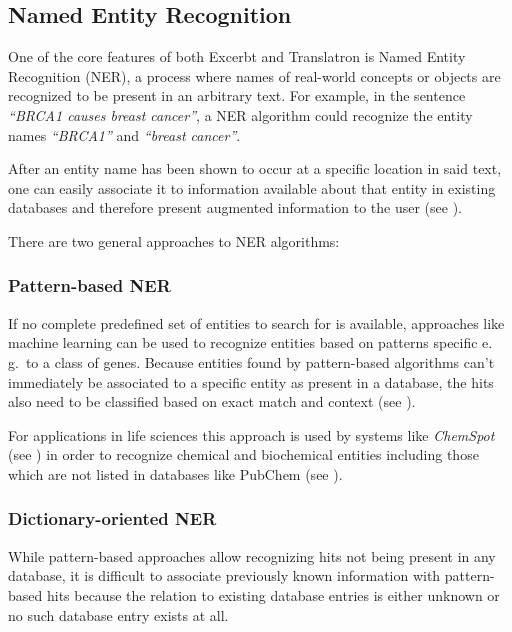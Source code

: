 \documentclass[a4paper, 12pt, twoside, reqn]{report}
\numberwithin{figure}{chapter}
\newtheorem[L]{boxedDefinition}{Definition}
\newtheorem[L]{boxedExample}{Example}
\newcommand{\eg}{e.\,g.\ }
\newcommand{\itquote}[1]{\textit{{``}#1{''}}}
\begin{document}
\subsection{Named Entity Recognition}\label{ssec:ner}

One of the core features of both Excerbt and Translatron is Named Entity Recognition (NER), a process where names of real-world concepts or objects are recognized to be present in an arbitrary text. For example, in the sentence \itquote{BRCA1 causes breast cancer}, a NER algorithm could recognize the entity names \itquote{BRCA1} and \itquote{breast cancer}.

After an entity name has been shown to occur at a specific location in said text, one can easily associate it to information available about that entity in existing databases and therefore present augmented information to the user (see \cite{nadeau2007survey}).

There are two general approaches to NER algorithms:

\subsubsection{Pattern-based NER}

If no complete predefined set of entities to search for is available, approaches like machine learning can be used to recognize entities based on patterns specific \eg to a class of genes. Because entities found by pattern-based algorithms can't immediately be associated to a specific entity as present in a database, the hits also need to be classified based on exact match and context (see \cite{nadeau2007survey}).

For applications in life sciences this approach is used by systems like \textit{ChemSpot} (see \cite{rocktaschel2012chemspot}) in order to recognize chemical and biochemical entities including those which are not listed in databases like PubChem (see \cite{wang2009pubchem}).

\subsubsection{Dictionary-oriented NER}

While pattern-based approaches allow recognizing hits not being present in any database, it is difficult to associate previously known information with pattern-based hits because the relation to existing database entries is either unknown or no such database entry exists at all.
\end{document}
